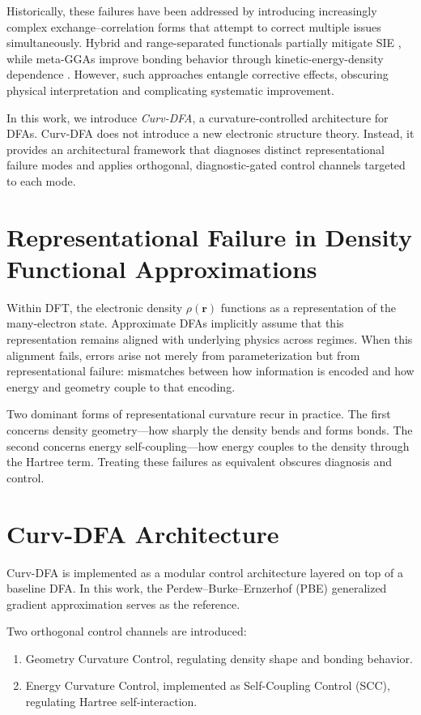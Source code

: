 \documentclass[11pt]{article}
\begin{document}
Historically, these failures have been addressed by introducing increasingly complex exchange--correlation forms that attempt to correct multiple issues simultaneously. Hybrid and range-separated functionals partially mitigate SIE \cite{HeydScuseriaErnzerhof,LCwPBE}, while meta-GGAs improve bonding behavior through kinetic-energy-density dependence \cite{SCAN}. However, such approaches entangle corrective effects, obscuring physical interpretation and complicating systematic improvement.

In this work, we introduce \emph{Curv-DFA}, a curvature-controlled architecture for DFAs. Curv-DFA does not introduce a new electronic structure theory. Instead, it provides an architectural framework that diagnoses distinct representational failure modes and applies orthogonal, diagnostic-gated control channels targeted to each mode.

\section{Representational Failure in Density Functional Approximations}

Within DFT, the electronic density $\rho(\mathbf r)$ functions as a representation of the many-electron state. Approximate DFAs implicitly assume that this representation remains aligned with underlying physics across regimes. When this alignment fails, errors arise not merely from parameterization but from representational failure: mismatches between how information is encoded and how energy and geometry couple to that encoding.

Two dominant forms of representational curvature recur in practice. The first concerns density geometry—how sharply the density bends and forms bonds. The second concerns energy self-coupling—how energy couples to the density through the Hartree term. Treating these failures as equivalent obscures diagnosis and control.

\section{Curv-DFA Architecture}

Curv-DFA is implemented as a modular control architecture layered on top of a baseline DFA. In this work, the Perdew--Burke--Ernzerhof (PBE) generalized gradient approximation \cite{PBE} serves as the reference.

Two orthogonal control channels are introduced:
\begin{enumerate}
  \item Geometry Curvature Control, regulating density shape and bonding behavior.
  \item Energy Curvature Control, implemented as Self-Coupling Control (SCC), regulating Hartree self-interaction.
\end{enumerate}
\end{document}

